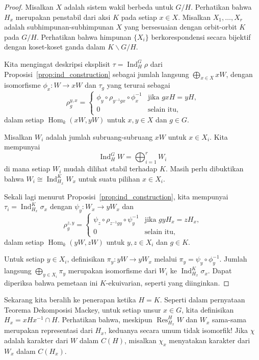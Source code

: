 \documentclass[12pt]{article}
\theoremstyle{plain}
\theoremstyle{definition}
\theoremstyle{remark}
\numberwithin{equation}{section}
\begin{document}
\begin{proof}
Misalkan $X$ adalah sistem wakil berbeda untuk $G/H$.
Perhatikan bahwa $H_x$ merupakan penstabil dari aksi $K$ pada setiap $x \in X$.
Misalkan $X_1,\ldots,X_r$ adalah subhimpunan-subhimpunan $X$ yang bersesuaian dengan
orbit-orbit $K$ pada $G/H$.
Perhatikan bahwa himpunan $\{X_i\}$ berkorespondensi secara bijektif dengan
koset-koset ganda dalam $K \backslash G / H$.

Kita mengingat deskripsi eksplisit $\tau = \operatorname{Ind}^G_H \rho$
dari Proposisi~\ref{prop:ind_construction}
sebagai jumlah langsung $\bigoplus_{x \in X} xW$,
dengan isomorfisme $\phi_x: W \to xW$ dan $\tau_g$ yang terurai sebagai
\[
\rho_g^{y,x} =
\begin{cases}
\phi_y \circ \rho_{y^{-1}gx} \circ \phi_x^{-1} & \textrm{jika $gxH=yH$,}\\
0 & \textrm{selain itu},
\end{cases}
\]
dalam setiap $\operatorname{Hom}_k(xW,yW)$
untuk $x,y \in X$ dan $g \in G$.

Misalkan $W_i$ adalah jumlah subruang-subruang $xW$ untuk $x \in X_i$.
Kita mempunyai
\[
\operatorname{Ind}^G_H W = \bigoplus_{i=1}^r W_i
\]
di mana setiap $W_i$ mudah dilihat stabil terhadap $K$.
Masih perlu dibuktikan bahwa
$W_i \cong \operatorname{Ind}_{H_x}^K W_x$ untuk suatu pilihan $x \in X_i$.

Sekali lagi menurut Proposisi~\ref{prop:ind_construction},
kita mempunyai $\tau_i = \operatorname{Ind}_{H_x}^K \sigma_x$
dengan $\psi_y : W_x \to yW_x$ dan
\[
\rho_g^{z,y} =
\begin{cases}
\psi_z \circ \rho_{z^{-1}gy} \circ \psi_y^{-1} & \textrm{jika $gyH_x=zH_x$,}\\
0 & \textrm{selain itu},
\end{cases}
\]
dalam setiap $\operatorname{Hom}_k(yW,zW)$
untuk $y,z \in X_i$ dan $g \in K$.

Untuk setiap $y \in X_i$, definisikan $\pi_y : yW \to yW_x$
melalui $\pi_y = \psi_y \circ \phi_y^{-1}$.
Jumlah langsung $\bigoplus_{y \in X_i} \pi_y$
merupakan isomorfisme dari $W_i$ ke $\operatorname{Ind}_{H_x}^K \sigma_x$.
Dapat diperiksa bahwa pemetaan ini $K$-ekuivarian, seperti yang diinginkan.
\end{proof}

Sekarang kita beralih ke penerapan ketika $H=K$.
Seperti dalam pernyataan Teorema Dekomposisi Mackey,
untuk setiap unsur $x \in G$, kita definisikan $H_x = xHx^{-1} \cap H$.
Perhatikan bahwa, meskipun $\operatorname{Res}^H_{H_x} W$
dan $W_x$ sama-sama merupakan representasi dari $H_x$,
keduanya secara umum tidak isomorfik!
Jika $\chi$ adalah karakter dari $W$ dalam $C(H)$, misalkan $\chi_x$ menyatakan
karakter dari $W_x$ dalam $C(H_x)$.
\end{document}

